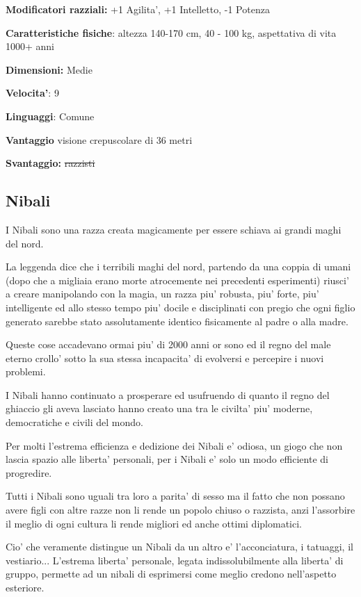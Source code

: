 \documentclass[a4paper,11pt,twoside,openany]{book}
\begin{document}
	\textbf{Modificatori razziali:} +1 Agilita', +1 Intelletto, -1 Potenza
	
	\textbf{Caratteristiche fisiche}: altezza 140-170 cm, 40 - 100 kg,
	aspettativa di vita 1000+ anni
	
	\textbf{Dimensioni:} Medie
	
	\textbf{Velocita'}: 9
	
	\textbf{Linguaggi}: Comune
	
	\textbf{Vantaggio} visione crepuscolare di 36 metri
	
	\textbf{Svantaggio:} \sout{razzisti}
	
	\subsection{Nibali}
	
	\label{nibali}
	
	I Nibali sono una razza creata magicamente per essere schiava ai grandi maghi del nord.
	
	La leggenda dice che i terribili maghi del nord, partendo da una coppia di umani (dopo che a migliaia erano morte atrocemente nei precedenti esperimenti) riusci' a creare manipolando con la magia, un razza piu' robusta, piu' forte, piu' intelligente ed allo stesso tempo piu' docile e disciplinati con pregio che ogni figlio generato sarebbe stato assolutamente identico fisicamente al padre o alla madre.
	
	Queste cose accadevano ormai piu' di 2000 anni or sono ed il regno del male eterno crollo' sotto la sua stessa incapacita' di evolversi e percepire i nuovi problemi.
	
	I Nibali hanno continuato a prosperare ed usufruendo di quanto il regno del ghiaccio gli aveva lasciato hanno creato una tra le civilta' piu' moderne, democratiche e civili del mondo.
	
	Per molti l'estrema efficienza e dedizione dei Nibali e' odiosa, un giogo che non lascia spazio alle liberta' personali, per i Nibali e' solo un modo efficiente di progredire.
	
	Tutti i Nibali sono uguali tra loro a parita' di sesso ma il fatto che non possano avere figli con altre razze non li rende un popolo chiuso o razzista, anzi l'assorbire il meglio di ogni cultura li rende migliori ed anche ottimi diplomatici. 
	
	Cio' che veramente distingue un Nibali da un altro e' l'acconciatura, i tatuaggi, il vestiario... L'estrema liberta' personale, legata indissolubilmente alla liberta' di gruppo, permette ad un nibali di esprimersi come meglio credono nell'aspetto esteriore.
	
\end{document}
